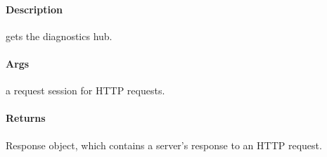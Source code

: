 \documentclass[letterpaper,10pt,english]{sphinxmanual}
\begin{document}
\begin{fulllineitems}
\label{\detokenize{gemini_lidar_hub_API:gemini_lidar_hub_API.get_lidar_hub_diagnostics}}
\pysigstartsignatures
{}
\pysigstopsignatures

\paragraph{Description}
\label{\detokenize{gemini_lidar_hub_API:id8}}
\sphinxAtStartPar
gets the diagnostics hub.


\paragraph{Args}
\label{\detokenize{gemini_lidar_hub_API:id9}}\begin{description}
\sphinxAtStartPar
a request session for HTTP requests.

\end{description}


\paragraph{Returns}
\label{\detokenize{gemini_lidar_hub_API:id10}}\begin{description}
\sphinxAtStartPar
Response object, which contains a server’s response to an HTTP request.

\end{description}

\end{fulllineitems}

\end{document}
